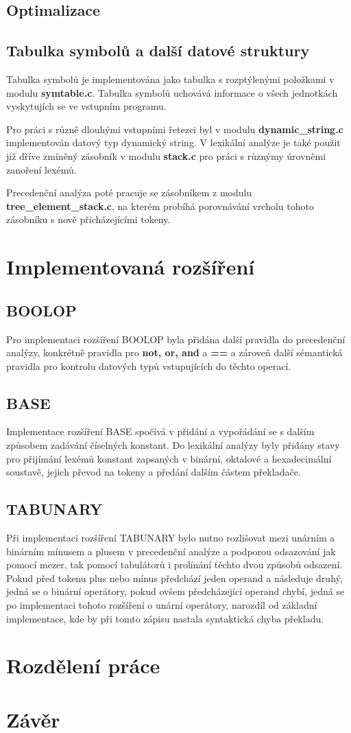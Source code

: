 \documentclass[12pt]{article}
\begin{document}
\subsection{Optimalizace}
\subsection{Tabulka symbolů a další datové struktury}
Tabulka symbolů je implementována jako tabulka s rozptýlenými položkami v modulu \textbf{symtable.c}. Tabulka symbolů uchovává informace o všech jednotkách vyskytujích se ve vstupním programu. 

Pro práci s různě dlouhými vstupními řetezci byl v modulu \textbf{dynamic\_string.c} implementován datový typ dynamický string. V lexikální analýze je také použit již dříve zmíněný zásobník v modulu \textbf{stack.c} pro práci s různýmy úrovněmi zanoření lexémů.


Precedenční analýza poté pracuje se zásobníkem z modulu \textbf{tree\_element\_stack.c}, na kterém pro\-bí\-há porovnávání vrcholu tohoto zásobníku s nově přicházejícími tokeny.
\section{Implementovaná rozšíření}
\subsection{BOOLOP}
Pro implementaci rozšíření BOOLOP byla přidána další pravidla do precedenční analýzy, konkrétně pravidla pro \textbf{not, or, and} a \textbf{==} a zároveň další sémantická pravidla pro kontrolu datových typů vstupujících do těchto operací.
\subsection{BASE}
Implementace rozšíření BASE spočívá v přidání a vypořádání se s dalším způsobem zadávání čí\-sel\-ných konstant. Do lexikální analýzy byly přidány stavy pro přijímání lexémů konstant zapsaných v binární, oktalové a hexadecimální soustavě, jejich převod na tokeny a předání dalším částem pře\-kla\-da\-če.
\subsection{TABUNARY}
Při implementaci rozšíření TABUNARY bylo nutno rozlišovat mezi unárním a bi\-nár\-ním mínusem a plusem v precedenční analýze a podporou odsazování jak pomocí mezer, tak pomocí tabulátorů i prolínání těchto dvou způsobů odsazení. Pokud před tokenu plus nebo mínus předchází jeden operand a následuje druhý, jedná se o binární operátory, pokud ovšem předcházející operand chybí, jedná se po implementaci tohoto rozšíření o unární operátory, narozdíl od základní implementace, kde by při tomto zápisu nastala syntaktická chyba překladu.
\section{Rozdělení práce}
\section{Závěr}
\end{document}
